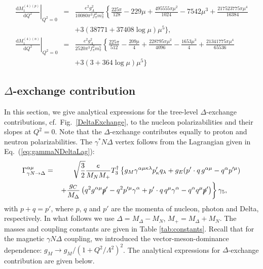 \documentclass[12pt,preprint,tightenlines,
showpacs,preprintnumbers,amsmath,amssymb,
a4paper,nofootinbib]{revtex4-1}
\def\bea{\begin{eqnarray}}
\def\eea{\end{eqnarray}}
\def\seclab#1{\label{sec:#1}}
\def\Eqref#1{Eq.~(\ref{eq:#1})}
\def\al{\alpha}
\def\nn{\nonumber}
\def\dd{\mathrm{d}}
\begin{document}
\bea
\left.\frac{\dd M_1^{(4)(p)} }{\dd Q^2}\right|_{Q^2=0}&=&\frac{e^2g_A^2}{10080\pi^3f_\pi^2m_\pi^5}\left\{\frac{225\pi}{128}-229\mu+\frac{495555\pi\mu^2}{1024}-7542\mu^3+\frac{217523775\pi\mu^4}{16384}\right.\\&&+3\left(38771+37408\log \mu\right)\mu^5\Bigg\},\nn\\
\left.\frac{\dd M_1^{(4)(n)} }{\dd Q^2}\right|_{Q^2=0}&=&\frac{e^2g_A^2}{2520\pi^3f_\pi^2m_\pi^5}\left\{\frac{225\pi}{512}-\frac{209\mu}{4}+\frac{228795\pi\mu^2}{4096}-\frac{1653\mu^3}{4}+\frac{21341775\pi\mu^4}{65536}\right.\\
&&+3\left(3+364\log \mu\right)\mu^5\Bigg\}\nn
\eea

\subsection{ $\Delta$-exchange contribution}\seclab{DeltaTreePolarizabilities}



In this section, we give analytical expressions for the  tree-level $\Delta$-exchange contributions, cf.\ Fig.~\ref{DeltaExchange}, to the nucleon polarizabilities and their slopes at $Q^2=0$. Note that the $\Delta$-exchange  contributes equally to proton and neutron polarizabilities. The $\gamma^* N \Delta$ vertex follows from the Lagrangian given in \Eqref{gammaNDeltaLag}:
\bea
\Gamma_{\gamma N \rightarrow \Delta}^{\al \mu}&=&\sqrt{\frac{3}{2}}\frac{e}{M_N M_+}T_3^\dagger\left\{g_M \gamma^{\al \mu \kappa \lambda}p'_\kappa q_\lambda+g_E (p'\cdot q\, g^{\al \mu}-q^\al p^{\prime\mu})\right.\\
&&\left.+\frac{g_C}{M_\Delta} \left(q^2 g^{ \al \mu}\slashed{p}'-q^2 p^{\prime\mu} \gamma^\al +p'\cdot q \,q^\mu \gamma^\al-q^\al q^\mu \slashed{p}'\right)\right\}\gamma_5,\qquad\nn
\eea
with $p+q=p'$, where $p$, $q$ and $p'$ are the momenta of nucleon, photon and Delta, respectively. In what follows we use $\varDelta = M_\Delta - M_N$, $M_+=M_\Delta+M_N$. The masses and coupling constants are given in Table \ref{tab:constants}.  Recall that for the magnetic $\gamma N \Delta $ coupling, we introduced the vector-meson-dominance dependence: $g_M \rightarrow g_M/(1+Q^2/\Lambda^2)^2$. The analytical expressions for $\Delta$-exchange contribution are given below.
\end{document}
